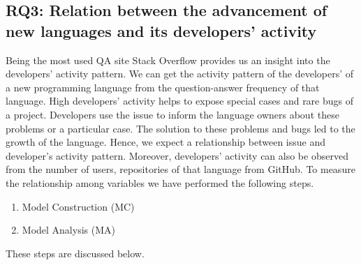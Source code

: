 \subsection{RQ3: Relation between the advancement of new languages and its developers' activity}
\label{RQ2}
Being the most used QA site Stack Overflow provides us an insight into the developers' activity pattern. We can get the activity pattern of the developers' of a new programming language from the question-answer frequency of that language. High developers' activity helps to expose special cases and rare bugs of a project. Developers use the issue to inform the language owners about these problems or a particular case. The solution to these problems and bugs led to the growth of the language. Hence, we expect a  relationship between issue and developer's activity pattern. Moreover, developers' activity can also be observed from the number of users, repositories of that language from GitHub. To measure the relationship among variables we have performed the following steps.
\begin{enumerate}
    \item Model Construction (MC)
    \item Model Analysis (MA)
\end{enumerate}
These steps are discussed below.

